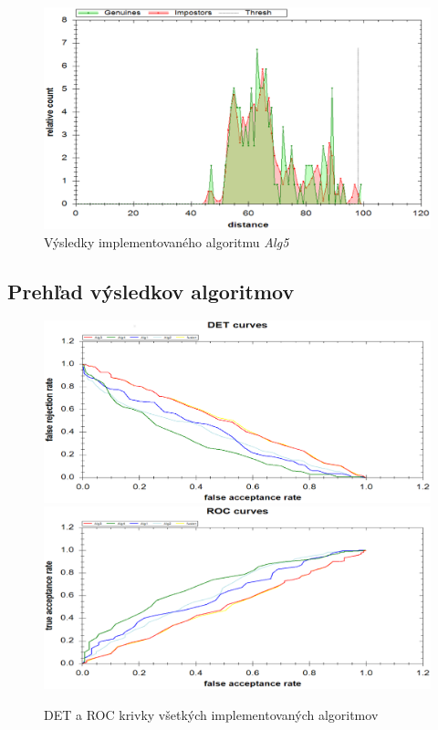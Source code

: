 \documentclass[11pt,a4paper]{article}
\begin{document}
\clearpage

\vfill
\begin{figure}[ht!]
	\centering
	\includegraphics[width=17cm]{fig/alg5.eps}
	\caption{\label{fig:alg5} Výsledky implementovaného algoritmu \emph{Alg5}}
\end{figure}
\vfill
\vfill

\clearpage
\subsection{Prehľad výsledkov algoritmov} \label{vysledky}

\vfill
\begin{figure}[ht!]
	\centering
	\includegraphics[width=17cm]{fig/det_all.eps}
	\includegraphics[width=17cm]{fig/roc_all.eps}
	\caption{\label{fig:all} DET a ROC krivky všetkých implementovaných algoritmov}
\end{figure}
\vfill
\vfill
\end{document}
